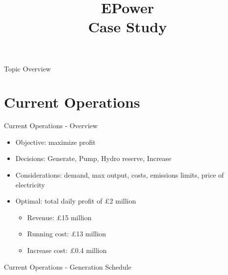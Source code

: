 \documentclass{beamer}
\title[EPower Case Study]{\Huge EPower\\[0.2cm]\large Case Study}
\institute{LPMS Consultancy}
\begin{document}
	
    
    
    \begin{frame}
    	\titlepage
    \end{frame}
    
    
    \begin{frame}{Topic Overview}
        
        \tableofcontents
            
    \end{frame}
    
    
    \section{Current Operations}
    
    \begin{frame}{Current Operations - Overview}
    	\begin{itemize}
    	\item Objective: maximize profit
        \item Decisions: Generate, Pump, Hydro reserve, Increase 
        \item Considerations: demand, max output, costs, emissions limits, price of electricity
        \item Optimal: total daily profit of £2 million
        	\begin{itemize}
                \item Revenue: £15 million
                \item Running cost: £13 million
                \item Increase cost: £0.4 million
        	\end{itemize}
    	\end{itemize}
    \end{frame}
    
    
    \begin{frame}{Current Operations - Generation Schedule}
    
    	\begin{figure}[H]
            \centering
        \end{figure}%

    \end{frame}
    
\end{document}
